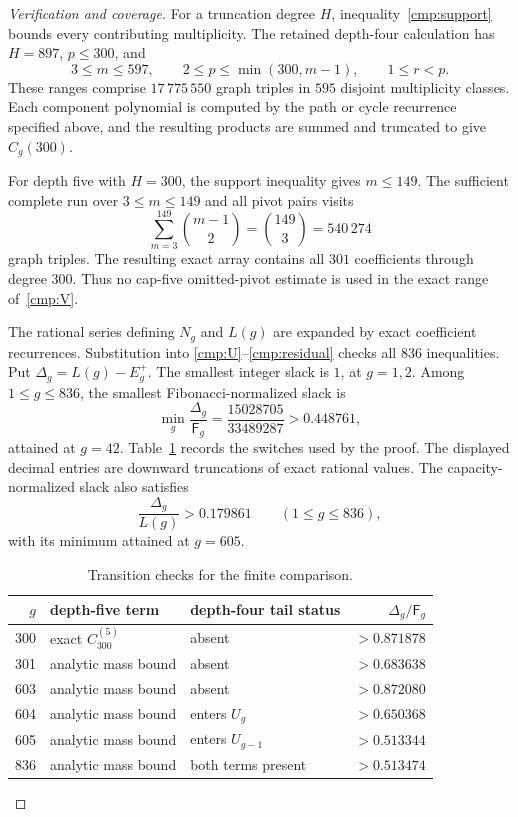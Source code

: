 \documentclass[11pt]{amsart}
\theoremstyle{definition}
\theoremstyle{remark}
\newcommand{\Fib}{\mathsf F}
\numberwithin{equation}{section}
\begin{document}
\begin{proof}[Verification and coverage]
For a truncation degree $H$, inequality~\eqref{cmp:support} bounds every
contributing multiplicity. The retained depth-four calculation has
$H=897$, $p\le300$, and
\[
 3\le m\le597,\qquad
 2\le p\le\min(300,m-1),\qquad 1\le r<p.
\]
These ranges comprise $17\,775\,550$ graph triples in $595$ disjoint
multiplicity classes. Each component polynomial is computed by the path or
cycle recurrence specified above, and the resulting products are summed and
truncated to give $C_g(300)$.

For depth five with $H=300$, the support inequality gives $m\le149$.
The sufficient complete run over $3\le m\le149$ and all pivot pairs visits
\[
 \sum_{m=3}^{149}\binom{m-1}{2}=\binom{149}{3}=540\,274
\]
graph triples. The resulting exact array contains all $301$ coefficients
through degree $300$. Thus no cap-five omitted-pivot estimate is used in the
exact range of~\eqref{cmp:V}.

The rational series defining $N_g$ and $L(g)$ are expanded by exact
coefficient recurrences. Substitution into
\eqref{cmp:U}--\eqref{cmp:residual} checks all $836$ inequalities. Put
$\Delta_g=L(g)-E^+_g$. The smallest integer slack is $1$, at $g=1,2$.
Among $1\le g\le836$, the smallest Fibonacci-normalized slack is
\[
 \min_g\frac{\Delta_g}{\Fib_g}
 =\frac{15028705}{33489287}>0.448761,
\]
attained at $g=42$. Table~\ref{tab:finite-transitions} records the switches
used by the proof. The displayed decimal entries are downward truncations of
exact rational values. The capacity-normalized slack also satisfies
\[
 \frac{\Delta_g}{L(g)}>0.179861\qquad(1\le g\le836),
\]
with its minimum attained at $g=605$.


\begin{table}[ht]
\centering\small
\caption{Transition checks for the finite comparison.}
\label{tab:finite-transitions}
\begin{tabular}{@{}rllr@{}}
\toprule
$g$ & depth-five term & depth-four tail status & $\Delta_g/\Fib_g$\\
\midrule
300 & exact $C^{(5)}_{300}$ & absent & $>0.871878$\\
301 & analytic mass bound & absent & $>0.683638$\\
603 & analytic mass bound & absent & $>0.872080$\\
604 & analytic mass bound & enters $U_g$ & $>0.650368$\\
605 & analytic mass bound & enters $U_{g-1}$ & $>0.513344$\\
836 & analytic mass bound & both terms present & $>0.513474$\\
\bottomrule
\end{tabular}
\end{table}



\end{proof}
\end{document}
